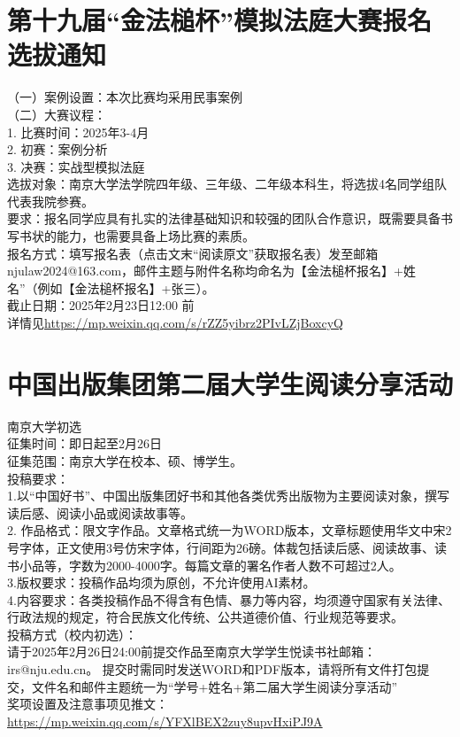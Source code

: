 \documentclass[letterpaper, 12pt]{article}
\begin{document}
\begin{multicols}{2}
\section{第十九届“金法槌杯”模拟法庭大赛报名选拔通知}
（一）案例设置：本次比赛均采用民事案例\\
（二）大赛议程：\\
1. 比赛时间：2025年3-4月\\
2. 初赛：案例分析\\
3. 决赛：实战型模拟法庭\\
选拔对象：南京大学法学院四年级、三年级、二年级本科生，将选拔4名同学组队代表我院参赛。\\
要求：报名同学应具有扎实的法律基础知识和较强的团队合作意识，既需要具备书写书状的能力，也需要具备上场比赛的素质。\\
报名方式：填写报名表（点击文末“阅读原文”获取报名表）发至邮箱 njulaw2024@163.com，邮件主题与附件名称均命名为【金法槌杯报名】+姓名”（例如【金法槌杯报名】+张三）。\\
截止日期：2025年2月23日12:00 前\\
详情见\url{https://mp.weixin.qq.com/s/rZZ5yibrz2PIvLZjBoxcyQ}\\

\section{中国出版集团第二届大学生阅读分享活动}
南京大学初选\\
征集时间：即日起至2月26日\\
征集范围：南京大学在校本、硕、博学生。\\
投稿要求：\\
1.以“中国好书”、中国出版集团好书和其他各类优秀出版物为主要阅读对象，撰写读后感、阅读小品或阅读故事等。\\
2. 作品格式：限文字作品。文章格式统一为WORD版本，文章标题使用华文中宋2号字体，正文使用3号仿宋字体，行间距为26磅。体裁包括读后感、阅读故事、读书小品等，字数为2000-4000字。每篇文章的署名作者人数不可超过2人。\\
3.版权要求：投稿作品均须为原创，不允许使用AI素材。\\
4.内容要求：各类投稿作品不得含有色情、暴力等内容，均须遵守国家有关法律、行政法规的规定，符合民族文化传统、公共道德价值、行业规范等要求。\\
投稿方式（校内初选）：\\
请于2025年2月26日24:00前提交作品至南京大学学生悦读书社邮箱：irs@nju.edu.cn。
提交时需同时发送WORD和PDF版本，请将所有文件打包提交，文件名和邮件主题统一为“学号+姓名+第二届大学生阅读分享活动”\\
奖项设置及注意事项见推文：\url{https://mp.weixin.qq.com/s/YFXlBEX2zuy8upvHxiPJ9A}

\end{multicols} 
\end{document}
